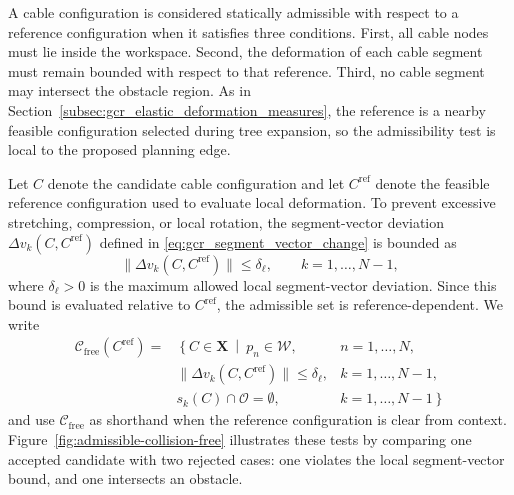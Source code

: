 \documentclass{pas}
\begin{document}
A cable configuration is considered statically admissible with respect to a reference configuration when it satisfies three conditions. First, all cable nodes must lie inside the workspace. Second, the deformation of each cable segment must remain bounded with respect to that reference. Third, no cable segment may intersect the obstacle region. As in Section~\ref{subsec:gcr_elastic_deformation_measures}, the reference is a nearby feasible configuration selected during tree expansion, so the admissibility test is local to the proposed planning edge.


Let \(C\) denote the candidate cable configuration and let
\(C^{\mathrm{ref}}\) denote the feasible reference configuration used to
evaluate local deformation. To prevent excessive stretching, compression, or
local rotation, the segment-vector deviation \(\Delta v_k(C,C^{\mathrm{ref}})\)
defined in \eqref{eq:gcr_segment_vector_change} is bounded as
\begin{equation}
\|\Delta v_k(C, C^{\mathrm{ref}})\|
\leq
\delta_{\ell},
\qquad
k=1,\ldots,N-1,
\label{eq:segment_vector_displacement_bound}
\end{equation}
where \(\delta_{\ell}>0\) is the maximum allowed local segment-vector deviation. Since this bound is evaluated relative to \(C^{\mathrm{ref}}\), the admissible set is reference-dependent. We write
\begin{equation}
\begin{aligned}
\mathcal{C}_{\mathrm{free}}(C^{\mathrm{ref}})
= &
\left\{
C\in\mathbf{X}
\ \middle|\
\right.
p_n\in\mathcal{W},
& n=1,\ldots,N,
\\
&
\|\Delta  v_k(C, C^{\mathrm{ref}})\|
\leq
\delta_{\ell},
& k=1,\ldots,N-1,
\\
&
s_k(C)\cap\mathcal{O}=\emptyset,
& \left. k=1,\ldots,N-1
\right\}
\end{aligned}
\label{eq:collision_free_configuration_space}
\end{equation}
and use \(\mathcal{C}_{\mathrm{free}}\) as shorthand when the reference
configuration is clear from context.
Figure~\ref{fig:admissible-collision-free} illustrates these tests by comparing
one accepted candidate with two rejected cases: one violates the local
segment-vector bound, and one intersects an obstacle.
\end{document}

